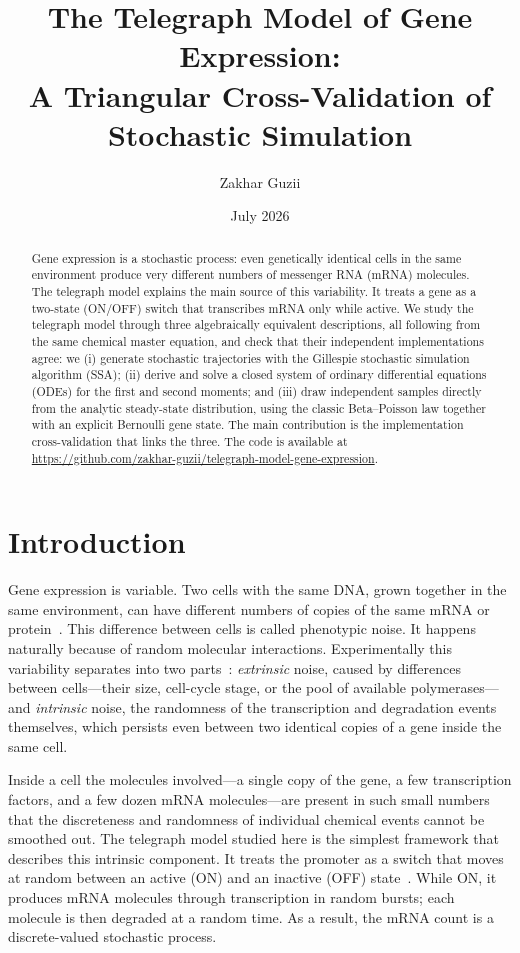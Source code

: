 \documentclass[11pt]{article}
\title{\textbf{The Telegraph Model of Gene Expression:\\
A Triangular Cross-Validation of Stochastic Simulation}}
\author{Zakhar Guzii}
\affil{Kyiv School of Economics, Department of Mathematics\\
\texttt{zakharguzii@gmail.com}}
\date{July 2026}
\begin{document}
\maketitle

\begin{abstract}
Gene expression is a stochastic process: even genetically identical cells in the same
environment produce very different numbers of messenger RNA (mRNA) molecules. The
telegraph model explains the main source of this variability. It treats a gene as a
two-state (ON/OFF) switch that transcribes mRNA only while active. We study the
telegraph model through three algebraically equivalent descriptions, all following from
the same chemical master equation, and check that their independent implementations
agree: we (i) generate stochastic trajectories with the Gillespie
stochastic simulation algorithm (SSA); (ii) derive and solve a closed system of
ordinary differential equations (ODEs) for the first and second moments; and
(iii) draw independent samples directly from the analytic steady-state
distribution, using the classic Beta--Poisson law together with an explicit
Bernoulli gene state. The main
contribution is the implementation cross-validation that links the three. The code is available at
\url{https://github.com/zakhar-guzii/telegraph-model-gene-expression}.
\end{abstract}

\section{Introduction}

Gene expression is variable.
Two cells with the same DNA, grown together in the same environment, can have different numbers of copies of the same mRNA or protein~\cite{elowitz2002,ozbudak2002}.
This difference between cells is called phenotypic noise. It happens naturally because of random molecular interactions. Experimentally this variability separates into two parts~\cite{elowitz2002}: \emph{extrinsic} noise, 
caused by differences between cells---their size, cell-cycle stage, or the pool of available polymerases---and \emph{intrinsic} noise, 
the randomness of the transcription and degradation events themselves, which persists even between two identical copies of a gene inside the same cell.

Inside a cell the molecules involved---a single copy of the gene, a few transcription factors,
and a few dozen mRNA molecules---are present in such small numbers that the discreteness and randomness of individual chemical events cannot be smoothed out.
The telegraph model studied here is the simplest framework that describes this intrinsic component.
It treats the promoter as a switch that moves at random between an active (ON) and an inactive (OFF) state~\cite{ko1991}.
While ON, it produces mRNA molecules through transcription in random bursts; each molecule is then degraded at a random time. As a result, the mRNA count is a discrete-valued stochastic process.
\end{document}

